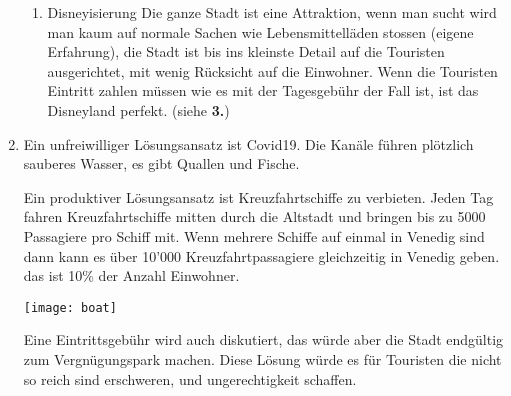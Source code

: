 \documentclass[12pt, letterpaper, twoside]{article}
\begin{document}
\begin{flushleft}
\begin{enumerate}[label=\textbf{\arabic* .}]
\begin{enumerate}[label=\textbf{\alph* )}]
	\item %
	Disneyisierung
	Die ganze Stadt ist eine Attraktion, wenn man sucht wird man kaum auf normale Sachen wie
	Lebensmittelläden stossen (eigene Erfahrung), die Stadt ist bis ins kleinste Detail auf die
	Touristen ausgerichtet, mit wenig Rücksicht auf die Einwohner. Wenn die Touristen Eintritt
	zahlen müssen wie es mit der Tagesgebühr der Fall ist, ist das Disneyland perfekt.
	(siehe \textbf{3.})


    \end{enumerate}

    \item %
    Ein unfreiwilliger Lösungsansatz ist Covid19.
    Die Kanäle führen plötzlich sauberes Wasser, es gibt Quallen und Fische.

    Ein produktiver Lösungsansatz ist Kreuzfahrtschiffe zu verbieten.
    Jeden Tag fahren Kreuzfahrtschiffe mitten durch die Altstadt und bringen bis zu 5000 Passagiere pro
    Schiff mit. Wenn mehrere Schiffe auf einmal in Venedig sind dann kann es über 10'000 Kreuzfahrtpassagiere
    gleichzeitig in Venedig geben. das ist 10\% der Anzahl Einwohner.

    \texttt{[image: boat]}

    Eine Eintrittsgebühr wird auch diskutiert, das würde aber die Stadt endgültig zum Vergnügungspark machen.
    Diese Lösung würde es für Touristen die nicht so reich sind erschweren, und ungerechtigkeit schaffen.



\end{enumerate}

\end{flushleft}
\end{document}
